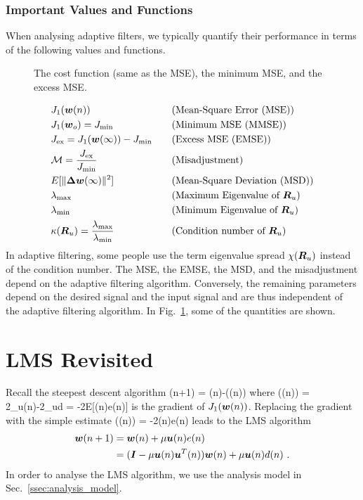 \subsubsection{Important Values and Functions}
When analysing adaptive filters, we typically quantify their performance in terms of the following values and functions.
\begin{figure}[htbp]
  \centering
  \caption{The cost function (same as the MSE), the minimum MSE, and the excess MSE.}
  \label{fig:learning_curve_sgm}
\end{figure}
\begin{alignat}{2}
  &J_1(\boldsymbol{w}(n))  &\quad &\text{(Mean-Square Error (MSE))}\\
  &J_1(\boldsymbol{w}_o) = J_\textup{min} &\quad &\text{(Minimum MSE (MMSE))}\\
  &J_\textup{ex} = J_1(\boldsymbol{w}(\infty))-J_\textup{min} &\quad &\text{(Excess MSE (EMSE))}\\
  &\mathcal{M} = \frac{ J_\textup{ex}}{J_\textup{min}} &\quad &\text{(Misadjustment)}\\
  &E[\|\boldsymbol{\Delta}\boldsymbol{w}(\infty)\|^2]  &\quad &\text{(Mean-Square Deviation (MSD))}\\
  &\lambda_\textup{max}  &\quad &\text{(Maximum Eigenvalue of $\boldsymbol{R}_u$)}\\
  &\lambda_\textup{min}  &\quad &\text{(Minimum Eigenvalue of $\boldsymbol{R}_u$)}\\
  &\kappa(\boldsymbol{R}_u) = \frac{\lambda_\textup{max}}{\lambda_\textup{min}} &\quad &\text{(Condition number of $\boldsymbol{R}_u$)}
\end{alignat}
In adaptive filtering, some people use the term eigenvalue spread $\chi(\boldsymbol{R}_u)$ instead of the condition number. The MSE, the EMSE, the MSD, and the misadjustment depend on the adaptive filtering algorithm. Conversely, the remaining parameters depend on the desired signal and the input signal and are thus independent of the adaptive filtering algorithm. In Fig.~\ref{fig:learning_curve_sgm}, some of the quantities are shown.

\section{LMS Revisited}
Recall the steepest descent algorithm
\bmath
  (n+1) = (n)-((n))
\emath
where
\bmath
  ((n)) = 2_u(n)-2_{ud} = -2E[(n)e(n)]
\emath
is the gradient of $J_1(\boldsymbol{w}(n))$. Replacing the gradient with the simple estimate 
\bmath
  ((n)) = -2(n)e(n)
\emath
leads to the LMS algorithm
\begin{align}
  \boldsymbol{w}(n+1) &= \boldsymbol{w}(n) + \mu\boldsymbol{u}(n)e(n)\\
                &= (\boldsymbol{I}-\mu\boldsymbol{u}(n)\boldsymbol{u}^T(n))\boldsymbol{w}(n) + \mu\boldsymbol{u}(n)d(n)\ .
\end{align}
In order to analyse the LMS algorithm, we use the analysis model in Sec.~\ref{ssec:analysis_model}.

